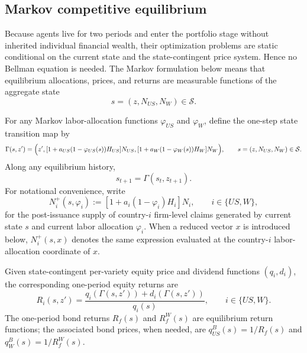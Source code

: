 \documentclass{article}
\begin{document}
\subsection{\texorpdfstring{Markov competitive equilibrium}{Markov competitive equilibrium}}

Because agents live for two periods and enter the portfolio stage without inherited individual financial wealth, their optimization problems are static conditional on the current state and the state-contingent price system. Hence no Bellman equation is needed. The Markov formulation below means that equilibrium allocations, prices, and returns are measurable functions of the aggregate state
\[
s=(z,N_{US},N_W)\in\mathcal S.
\]

For any Markov labor-allocation functions $\varphi_{US}$ and $\varphi_W$, define the one-step state transition map by
\begin{equation}\label{recursive_next_state}
\Gamma(s,z')
=
\Bigl(
 z',
 [1+a_{US}(1-\varphi_{US}(s))H_{US}]N_{US},
 [1+a_W(1-\varphi_W(s))H_W]N_W
\Bigr),
\qquad
s=(z,N_{US},N_W)\in\mathcal S.
\end{equation}
Along any equilibrium history,
\[
s_{t+1}=\Gamma(s_t,z_{t+1}).
\]
For notational convenience, write
\[
N_i^+(s,\varphi_i)
:=
[1+a_i(1-\varphi_i)H_i]N_i,
\qquad
i\in\{US,W\},
\]
for the post-issuance supply of country-$i$ firm-level claims generated by current state $s$ and current labor allocation $\varphi_i$. When a reduced vector $x$ is introduced below, $N_i^+(s,x)$ denotes the same expression evaluated at the country-$i$ labor-allocation coordinate of $x$.

Given state-contingent per-variety equity price and dividend functions $(q_i,d_i)$, the corresponding one-period equity returns are
\begin{equation}\label{recursive_returns}
R_i(s,z')
=
\frac{q_i(\Gamma(s,z'))+d_i(\Gamma(s,z'))}{q_i(s)},
\qquad
i\in\{US,W\}.
\end{equation}
The one-period bond returns $R_f(s)$ and $R_f^W(s)$ are equilibrium return functions; the associated bond prices, when needed, are $q^B_{US}(s)=1/R_f(s)$ and $q^B_W(s)=1/R_f^W(s)$.
\end{document}
